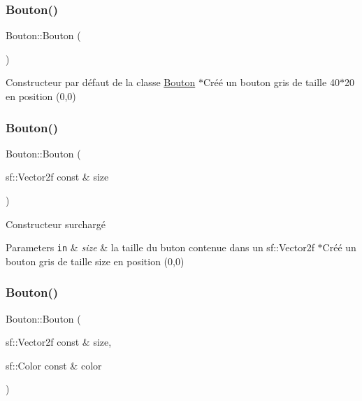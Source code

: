 \subsubsection{\texorpdfstring{Bouton()}{Bouton()}\hspace{0.1cm}{\footnotesize\ttfamily [1/5]}}
{\footnotesize\ttfamily Bouton\+::\+Bouton (\begin{DoxyParamCaption}{ }\end{DoxyParamCaption})}

Constructeur par défaut de la classe \hyperlink{classBouton}{Bouton} $\ast$\+Créé un bouton gris de taille 40$\ast$20 en position (0,0) \mbox{\label{classBouton_a5e8167b03707ae5bae44cb8f281e9a56}} 
\subsubsection{\texorpdfstring{Bouton()}{Bouton()}\hspace{0.1cm}{\footnotesize\ttfamily [2/5]}}
{\footnotesize\ttfamily Bouton\+::\+Bouton (\begin{DoxyParamCaption}\item[{sf\+::\+Vector2f const \&}]{size }\end{DoxyParamCaption})}

Constructeur surchargé 
\begin{DoxyParams}[1]{Parameters}
\mbox{\tt in}  & {\em size} & la taille du buton contenue dans un sf\+::\+Vector2f $\ast$\+Créé un bouton gris de taille size en position (0,0) \\
\hline
\end{DoxyParams}
\mbox{\label{classBouton_a116bf7c1c63d6989dc7b80ed44ac44fd}} 
\subsubsection{\texorpdfstring{Bouton()}{Bouton()}\hspace{0.1cm}{\footnotesize\ttfamily [3/5]}}
{\footnotesize\ttfamily Bouton\+::\+Bouton (\begin{DoxyParamCaption}\item[{sf\+::\+Vector2f const \&}]{size,  }\item[{sf\+::\+Color const \&}]{color }\end{DoxyParamCaption})}

